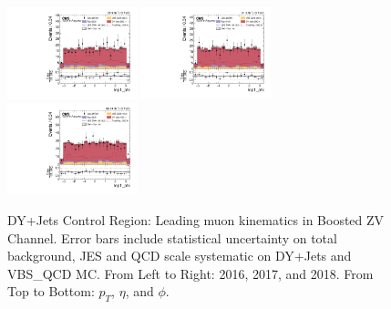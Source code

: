 \begin{figure}[!ht]
  \includegraphics[width=0.335\textwidth]{analysis_plots/2016_zv/cr_vjets_m/lep1_phi.pdf} \hspace{-10pt}
  \includegraphics[width=0.335\textwidth]{analysis_plots/2017_zv/cr_vjets_m/lep1_phi.pdf} \hspace{-10pt}
  \includegraphics[width=0.335\textwidth]{analysis_plots/2018_zv/cr_vjets_m/lep1_phi.pdf} \hspace{-10pt} \\
  \caption[DY+Jets Control Region: Leading muon kinematics in Boosted ZV Channel]%
  {DY+Jets Control Region: Leading muon kinematics in Boosted ZV Channel.
    Error bars include statistical uncertainty on total background,
    JES and QCD scale systematic on DY+Jets and VBS\_QCD MC\@. From Left to Right: 2016,
    2017, and 2018. From Top to Bottom: \( p_T \), \( \eta \), and \( \phi \).}%
  \label{fig:zv-cr-vjets-m-lep1-pt-eta-phi}
\end{figure}

